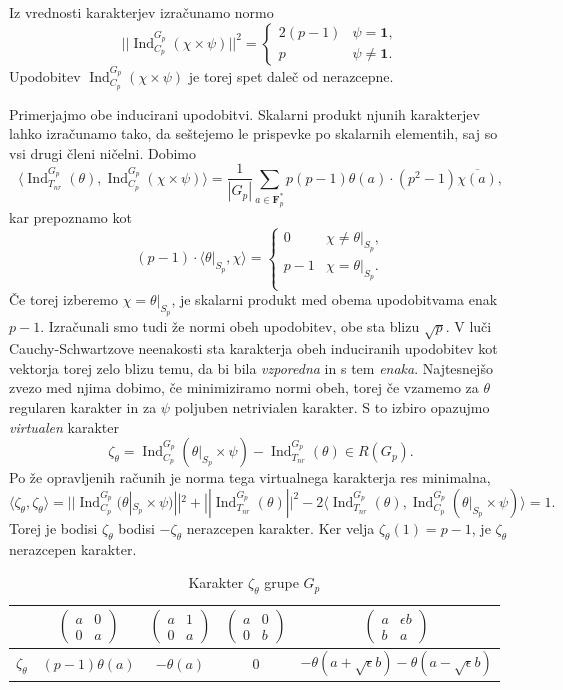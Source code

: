 \documentclass[11pt]{book}
\def\oneone{\mathbf{1}}
\def\FF{\mathbf{F}}
\DeclareMathOperator\Ind{Ind}
\newcommand{\mat}[4]{\left(\begin{smallmatrix}#1&#2\\#3&#4\end{smallmatrix}\right)}
\theoremstyle{definition}
\theoremstyle{zgled}
\theoremstyle{zgledbrezstevilke}
\theoremstyle{odprtproblem}
\theoremstyle{domacanaloga}
\theoremstyle{izrek}
\begin{document}
Iz vrednosti karakterjev izračunamo normo 
\[
    ||{\textstyle \Ind_{C_p}^{G_p}(\chi \times \psi)} ||^2
    = \begin{cases}
        2(p-1) & \psi = \oneone, \\
        p & \psi \neq \oneone.
    \end{cases}
\]
Upodobitev $\Ind_{C_p}^{G_p}(\chi \times \psi)$ je torej spet daleč od nerazcepne.

Primerjajmo obe inducirani upodobitvi. Skalarni produkt njunih karakterjev lahko izračunamo tako, da seštejemo le prispevke po skalarnih elementih, saj so vsi drugi členi ničelni. Dobimo
\[
{\textstyle \langle \Ind_{T_{nr}}^{G_p}(\theta), \Ind_{C_p}^{G_p}(\chi \times \psi) \rangle}
= \frac{1}{|G_p|} \sum_{a \in \FF_p^*} p(p-1) \theta(a) \cdot (p^2 - 1) \overline{\chi(a)},
\]
kar prepoznamo kot
\[
(p-1) \cdot \langle \theta |_{S_p}, \chi \rangle 
= \begin{cases}
        0 & \chi \neq \theta |_{S_p}, \\
        p-1 & \chi = \theta |_{S_p}. \\
\end{cases}  
\]
Če torej izberemo $\chi = \theta |_{S_p}$, je skalarni produkt med obema upodobitvama enak $p-1$. Izračunali smo tudi že normi obeh upodobitev, obe sta blizu $\sqrt{p}$. V luči Cauchy-Schwartzove neenakosti sta karakterja obeh induciranih upodobitev kot vektorja torej zelo blizu temu, da bi bila \emph{vzporedna} in s tem \emph{enaka}. Najtesnejšo zvezo med njima dobimo, če minimiziramo normi obeh, torej če vzamemo za $\theta$ regularen karakter in za $\psi$ poljuben netrivialen karakter. S to izbiro opazujmo \emph{virtualen} karakter
\[
    \textstyle \zeta_{\theta} = \Ind_{C_p}^{G_p}(\theta |_{S_p} \times \psi) - \Ind_{T_{nr}}^{G_p}(\theta) \in R(G_p).
\]
Po že opravljenih računih je norma tega virtualnega karakterja res minimalna,
\[
    \textstyle \langle \zeta_{\theta}, \zeta_{\theta} \rangle 
    = ||\Ind_{C_p}^{G_p}(\theta |_{S_p} \times \psi)||^2 + ||\Ind_{T_{nr}}^{G_p}(\theta)||^2 - 2 \langle \Ind_{T_{nr}}^{G_p}(\theta), \Ind_{C_p}^{G_p}(\theta |_{S_p} \times \psi) \rangle = 1.
\]
Torej je bodisi $\zeta_{\theta}$ bodisi $-\zeta_{\theta}$ nerazcepen karakter. Ker velja $\zeta_{\theta}(1) = p-1$, je $\zeta_{\theta}$ nerazcepen karakter.

\begin{table}[ht]
    \centering
\begin{tabular}{l|*{4}{c}}
    & 
    $\mat{a}{0}{0}{a}$
    &
    $\mat{a}{1}{0}{a}$
    &
    $\mat{a}{0}{0}{b}$
    &
    $\mat{a}{\epsilon b}{b}{a}$ \\ \hline
    $\zeta_{\theta}$ & $(p-1) \theta(a)$ & $-\theta(a)$ & $0$ & $- \theta(a + \sqrt{\epsilon} b) - \theta(a - \sqrt{\epsilon} b)$ \\
\end{tabular}
\caption{Karakter $\zeta_{\theta}$ grupe $G_p$}
\end{table}
\end{document}
